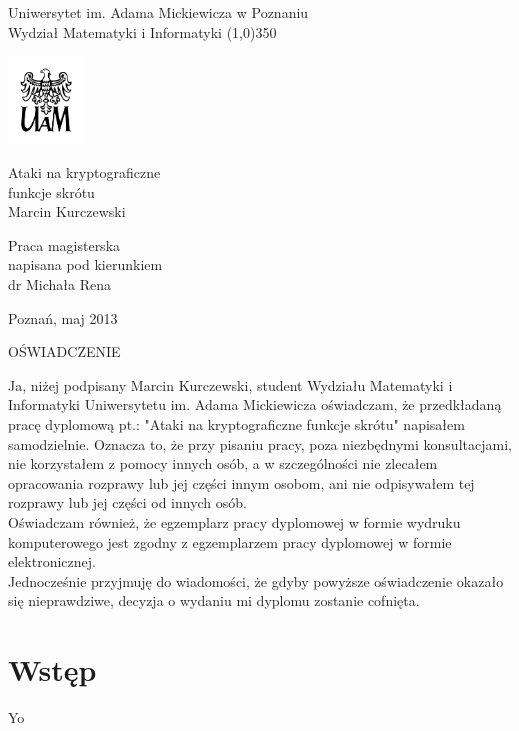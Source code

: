 \documentclass[12pt,a4paper,twoside]{article}
\begin{document}
\onehalfspacing

\begin{titlepage}
	\begin{center}
	{\LARGE Uniwersytet im. Adama Mickiewicza w Poznaniu \\
	Wydział Matematyki i Informatyki }
	\line(1,0){350}

	\vspace{1cm}
	\includegraphics[width=2cm]{logo-uam/logo-uam.png}
	\vspace{1cm}

	\vspace{1cm}
	{\Huge Ataki na kryptograficzne \\ funkcje skrótu} \\[0.5cm]
	{\Large Marcin Kurczewski}
	\end{center}

	\vspace{3cm}
	\hspace{8cm}\parbox[l]{6cm}{\Large Praca magisterska \\
	napisana pod kierunkiem \\
	dr Michała Rena}

	\begin{center}
	\vspace{4cm}
	Poznań, maj 2013
	\end{center}

\end{titlepage}


\newpage
\thispagestyle{empty}
\begin{center}
	OŚWIADCZENIE
\end{center}

	Ja, niżej podpisany Marcin Kurczewski, student Wydziału Matematyki i
Informatyki Uniwersytetu im. Adama Mickiewicza oświadczam, że przedkładaną pracę
dyplomową pt.: "Ataki na kryptograficzne funkcje skrótu" napisałem samodzielnie.
Oznacza to, że przy pisaniu pracy, poza niezbędnymi konsultacjami, nie
korzystałem z pomocy innych osób, a w szczególności nie zlecałem opracowania
rozprawy lub jej części innym osobom, ani nie odpisywałem tej rozprawy lub jej
części od innych osób. \\
	Oświadczam również, że egzemplarz pracy dyplomowej w formie wydruku
komputerowego jest zgodny z egzemplarzem pracy dyplomowej w formie
elektronicznej. \\
	Jednocześnie przyjmuję do wiadomości, że gdyby powyższe oświadczenie okazało
się nieprawdziwe, decyzja o wydaniu mi dyplomu zostanie cofnięta.


\newpage
\setcounter{tocdepth}{3}
\tableofcontents

\newpage
\pagestyle{fancy}


\section {Wstęp}
Yo
\end{document}
